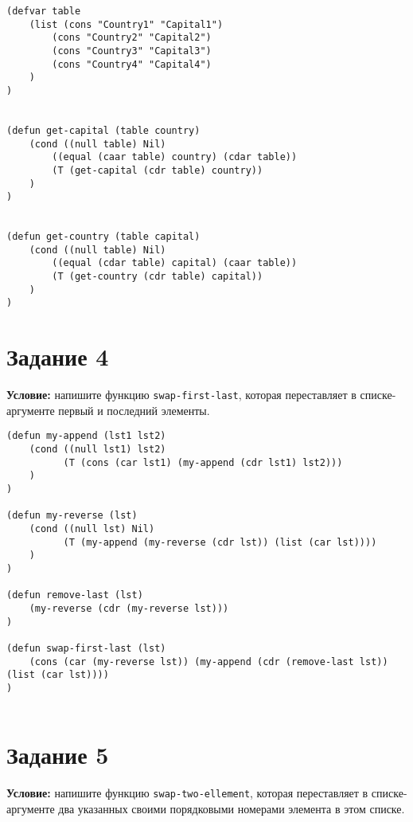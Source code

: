 \begin{lstlisting}
(defvar table 
    (list (cons "Country1" "Capital1")
        (cons "Country2" "Capital2")
        (cons "Country3" "Capital3")
        (cons "Country4" "Capital4")
    )
)


(defun get-capital (table country)
    (cond ((null table) Nil)
        ((equal (caar table) country) (cdar table))
        (T (get-capital (cdr table) country))
    )
)


(defun get-country (table capital)
    (cond ((null table) Nil)
        ((equal (cdar table) capital) (caar table))
        (T (get-country (cdr table) capital))
    )
)
\end{lstlisting}




\section{Задание 4}

\textbf{Условие:} напишите функцию \texttt{swap-first-last}, которая переставляет в списке-аргументе первый и последний элементы.

\begin{lstlisting}
(defun my-append (lst1 lst2)
    (cond ((null lst1) lst2)
          (T (cons (car lst1) (my-append (cdr lst1) lst2)))
    )
)

(defun my-reverse (lst)
    (cond ((null lst) Nil)
          (T (my-append (my-reverse (cdr lst)) (list (car lst))))
    )
)

(defun remove-last (lst)
    (my-reverse (cdr (my-reverse lst)))
)

(defun swap-first-last (lst)
    (cons (car (my-reverse lst)) (my-append (cdr (remove-last lst)) (list (car lst))))
)
    
\end{lstlisting}


\section{Задание 5}

\textbf{Условие:} напишите функцию \texttt{swap-two-ellement}, которая переставляет в списке-аргументе два указанных своими порядковыми номерами элемента в этом списке.


